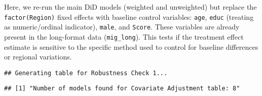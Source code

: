 \documentclass[
]{article}
\begin{document}
Here, we re-run the main DiD models (weighted and unweighted) but
replace the \texttt{factor(Region)} fixed effects with baseline control
variables: \texttt{age}, \texttt{educ} (treating as numeric/ordinal
indicator), \texttt{male}, and \texttt{Score}. These variables are
already present in the long-format data (\texttt{mig\_long}). This tests
if the treatment effect estimate is sensitive to the specific method
used to control for baseline differences or regional variations.

\begin{verbatim}
## Generating table for Robustness Check 1...
\end{verbatim}

\begin{verbatim}
## [1] "Number of models found for Covariate Adjustment table: 8"
\end{verbatim}
\end{document}
